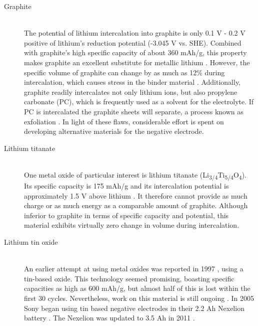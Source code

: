 \documentclass[12pt]{article} %
\begin{document}
\begin{description} %

\item[Graphite] \hfill \\
The potential of lithium intercalation into graphite is only 0.1 V - 0.2 V positive of lithium's reduction potential (-3.045 V vs. SHE).
Combined with graphite's high specific capacity of about 360 mAh/g, this property makes graphite an excellent substitute for metallic lithium \cite{reddy_thomas_figure_2011} \cite{reddy_thomas_figure_2011-1}.
However, the specific volume of graphite can change by as much as 12\% during intercalation, which causes stress in the binder material \cite{kulova_new_2013}.
Additionally, graphite readily intercalates not only lithium ions, but also propylene carbonate (PC), which is frequently used as a solvent for the electrolyte.
If PC is intercalated the graphite sheets will separate, a process known as exfoliation \cite{reddy_thomas_section_2011-2}.
In light of these flaws, considerable effort is spent on developing alternative materials for the negative electrode.

\item[Lithium titanate] \hfill \\
One metal oxide of particular interest is lithium titanate (Li\textsubscript{3/4}Ti\textsubscript{5/4}O\textsubscript{4}).
Its specific capacity is 175 mAh/g and its intercalation potential is approximately 1.5 V above lithium \cite{kulova_new_2013} \cite{reddy_thomas_figure_2011}.
It therefore cannot provide as much charge or as much energy as a comparable amount of graphite.
Although inferior to graphite in terms of specific capacity and potential, this material exhibits virtually zero change in volume during intercalation.

\item[Lithium tin oxide] \hfill \\

An earlier attempt at using metal oxides was reported in 1997 \cite{idota_tin-based_1997}, using a tin-based oxide.
This technology seemed promising, boasting specific capacities as high as 600 mAh/g, but almost half of this is lost within the first 30 cycles.
Nevertheless, work on this material is still ongoing \cite{kulova_new_2013}.
In 2005 Sony began using tin based negative electrodes in their 2.2 Ah Nexelion battery \cite{sony_sony_????}.
The Nexelion was updated to 3.5 Ah in 2011 \cite{sony_sony_????-1}.


\end{description}
\end{document}
